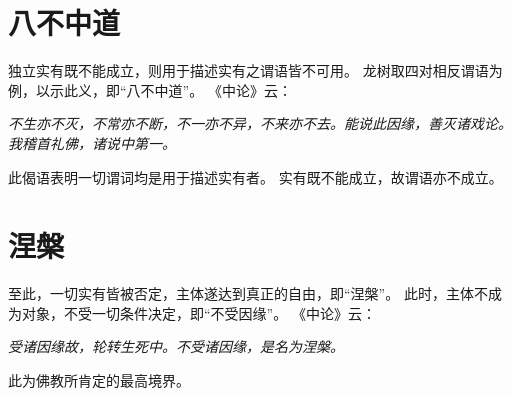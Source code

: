 \documentclass[11pt]{article}
\begin{document}
\section{八不中道}
独立实有既不能成立，则用于描述实有之谓语皆不可用。
龙树取四对相反谓语为例，以示此义，即“八不中道”。
《中论》云：

\textit{不生亦不灭，不常亦不断，不一亦不异，不来亦不去。能说此因缘，善灭诸戏论。我稽首礼佛，诸说中第一。}

此偈语表明一切谓词均是用于描述实有者。
实有既不能成立，故谓语亦不成立。

\section{涅槃}
至此，一切实有皆被否定，主体遂达到真正的自由，即“涅槃”。
此时，主体不成为对象，不受一切条件决定，即“不受因缘”。
《中论》云：

\textit{受诸因缘故，轮转生死中。不受诸因缘，是名为涅槃。}

此为佛教所肯定的最高境界。
    
\end{document}
